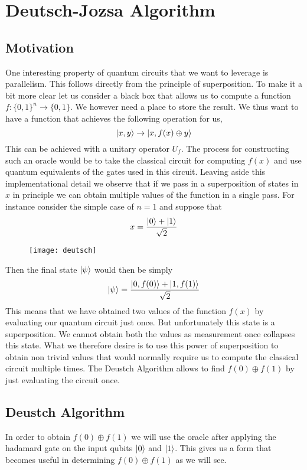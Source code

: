 \chapter{Deutsch-Jozsa Algorithm}

\section{Motivation}

One interesting property of quantum circuits that we want to leverage is parallelism. This follows directly from the principle of superposition. To make it a bit more clear let us consider a black box that allows us to compute a function $f: \{0, 1\}^n \to \{0, 1\}$. We however need a place to store the result. We thus want to have a function that achieves the following operation for us,
$$ \ket{x,y} \to \ket{x, f(x)\oplus y}$$
This can be achieved with a unitary operator $U_f$. The process for constructing such an oracle would be to take the classical circuit for computing $f(x)$ and use quantum equivalents of the gates used in this circuit. Leaving aside this implementational detail we observe that if we pass in a superposition of states in $x$ in principle we can obtain multiple values of the function in a single pass.
For instance consider the simple case of $n = 1$ and suppose that
$$ x = \frac{\ket{0} + \ket{1}}{\sqrt{2}}$$

\begin{figure}[htp]
    \centering
    \texttt{[image: deutsch]}
\end{figure}

Then the final state $\ket{\psi}$ would then be simply
$$\ket{\psi} = \frac{\ket{0, f(0)} + \ket{1, f(1)}}{\sqrt{2}}$$
This means that we have obtained two values of the function $f(x)$ by evaluating our quantum circuit just once. But unfortunately this state is a superposition. We cannot obtain both the values as measurement once collapses this state. What we therefore desire is to use this power of superposition to obtain non trivial values that would normally require us to compute the classical circuit multiple times. The Deustch Algorithm allows to find $f(0) \oplus f(1)$ by just evaluating the circuit once.

\section{Deustch Algorithm}

In order to obtain $f(0) \oplus f(1)$ we will use the oracle after applying the hadamard gate on the input qubits $\ket{0}$ and $\ket{1}$. This gives us a form that becomes useful in determining $f(0) \oplus f(1)$ as we will see.

